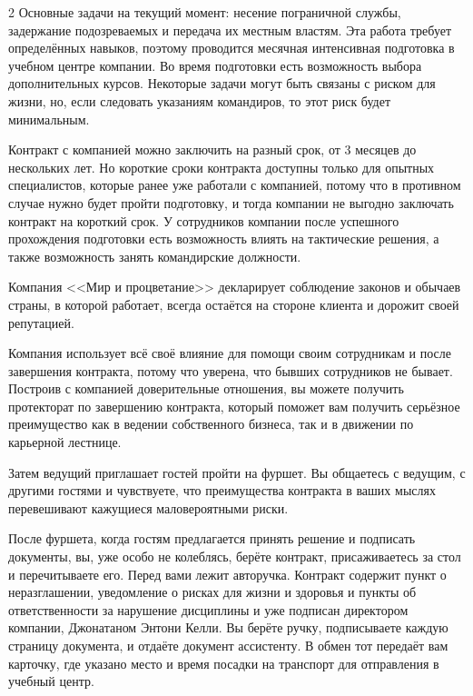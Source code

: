 \documentclass{article}
\begin{document}
\begin{multicols}{2}
Основные задачи на текущий момент: несение пограничной службы, задержание подозреваемых и передача их местным властям. Эта работа требует определённых навыков, поэтому проводится месячная интенсивная подготовка в учебном центре компании. Во время подготовки есть возможность выбора дополнительных курсов. Некоторые задачи могут быть связаны с риском для жизни, но, если следовать указаниям командиров, то этот риск будет минимальным.

Контракт с компанией можно заключить на разный срок, от 3 месяцев до нескольких лет. Но короткие сроки контракта доступны только для опытных специалистов, которые ранее уже работали с компанией, потому что в противном случае нужно будет пройти подготовку, и тогда компании не выгодно заключать контракт на короткий срок. У сотрудников компании после успешного прохождения подготовки есть возможность влиять на тактические решения, а также возможность занять командирские должности.

Компания <<Мир и процветание>> декларирует соблюдение законов и обычаев страны, в которой работает, всегда остаётся на стороне клиента и дорожит своей репутацией.

Компания использует всё своё влияние для помощи своим сотрудникам и после завершения контракта, потому что уверена, что бывших сотрудников не бывает. Построив с компанией доверительные отношения, вы можете получить протекторат по завершению контракта, который поможет вам получить серьёзное преимущество как в ведении собственного бизнеса, так и в движении по карьерной лестнице.

Затем ведущий приглашает гостей пройти на фуршет. Вы общаетесь с ведущим, с другими гостями и чувствуете, что преимущества контракта в ваших мыслях перевешивают кажущиеся маловероятными риски.

После фуршета, когда гостям предлагается принять решение и подписать документы, вы, уже особо не колеблясь, берёте контракт, присаживаетесь за стол и перечитываете его. Перед вами лежит авторучка. Контракт содержит пункт о неразглашении, уведомление о рисках для жизни и здоровья и пункты об ответственности за нарушение дисциплины и уже подписан директором компании, Джонатаном Энтони Келли. Вы берёте ручку, подписываете каждую страницу документа, и отдаёте документ ассистенту. В обмен тот передаёт вам карточку, где указано место и время посадки на транспорт для отправления в учебный центр.

\end{multicols}

\clearpage
\end{document}
